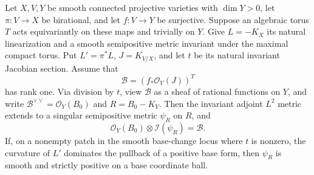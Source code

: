\begin{proposition}
\label{inj:exact-adjoint-ideal}
Let $X,V,Y$ be smooth connected projective varieties with $\dim Y>0$,
let $\pi:V\to X$ be birational, and let $f:V\to Y$ be surjective.
Suppose an algebraic torus $T$ acts equivariantly on these maps and
trivially on $Y$.
Give $L=-K_X$ its natural linearization and a smooth semipositive
metric invariant under the maximal compact torus. Put $L'=\pi^*L$,
$J=K_{V/X}$, and let $t$ be its natural invariant Jacobian section.
Assume that
\[
 \mathcal B=(f_*\mathcal O_V(J))^T
\]
has rank one. Via division by $t$, view $\mathcal B$ as a sheaf of
rational functions on $Y$, and write
$\mathcal B^{\vee\vee}=\mathcal O_Y(B_0)$ and $R=B_0-K_Y$.
Then the invariant adjoint $L^2$ metric extends to a singular
semipositive metric $\psi_R$ on $R$, and
\begin{equation}\label{inj:exact-ideal}
 \mathcal O_Y(B_0)\otimes\mathcal I(\psi_R)=\mathcal B.
\end{equation}
If, on a nonempty patch in the smooth base-change locus where $t$ is
nonzero, the curvature of $L'$ dominates the pullback of a positive
base form, then $\psi_R$ is smooth and strictly positive on a base
coordinate ball.
\end{proposition}


